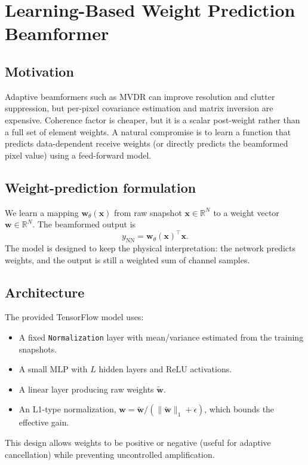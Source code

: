 \documentclass[conference]{IEEEtran}
\begin{document}
\section{Learning-Based Weight Prediction Beamformer}
\subsection{Motivation}
Adaptive beamformers such as MVDR can improve resolution and clutter suppression, but per-pixel covariance estimation and matrix inversion are expensive. Coherence factor is cheaper, but it is a scalar post-weight rather than a full set of element weights. A natural compromise is to learn a function that predicts data-dependent receive weights (or directly predicts the beamformed pixel value) using a feed-forward model.

\subsection{Weight-prediction formulation}
We learn a mapping $\mathbf{w}_\theta(\mathbf{x})$ from raw snapshot $\mathbf{x}\in\mathbb{R}^N$ to a weight vector $\mathbf{w}\in\mathbb{R}^N$. The beamformed output is
\begin{equation}
y_{\mathrm{NN}} = \mathbf{w}_\theta(\mathbf{x})^\top \mathbf{x}.
\end{equation}
The model is designed to keep the physical interpretation: the network predicts weights, and the output is still a weighted sum of channel samples.

\subsection{Architecture}
The provided TensorFlow model uses:
\begin{itemize}
    \item A fixed \texttt{Normalization} layer with mean/variance estimated from the training snapshots.
    \item A small MLP with $L$ hidden layers and ReLU activations.
    \item A linear layer producing raw weights $\tilde{\mathbf{w}}$.
    \item An L1-type normalization, $\mathbf{w}=\tilde{\mathbf{w}}/(\|\tilde{\mathbf{w}}\|_1+\epsilon)$, which bounds the effective gain.
\end{itemize}
This design allows weights to be positive or negative (useful for adaptive cancellation) while preventing uncontrolled amplification.
\end{document}
